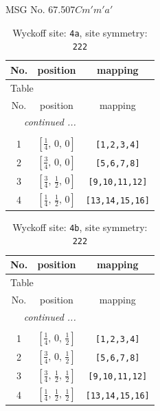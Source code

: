 \documentclass[fleqn,8pt]{jsarticle}
\begin{document}
\setcounter{MaxMatrixCols}{32}

\renewcommand{\tablename}{Table~}
\renewcommand{\figurename}{Figure~}
\begin{center}
\LARGE
MSG No. 67.507\quad$Cm'm'a'$
\end{center}
\renewcommand{\arraystretch}{1.2}
\begin{longtable}{ccc}
\caption{Wyckoff site: {\tt 4a}, site symmetry: {\tt 222}}
 \\
 \hline \hline
No. & position & mapping \\ \hline \endfirsthead

\multicolumn{2}{l}{\tablename\ \thetable{}} \\
 \hline \hline
No. & position & mapping \\ \hline \endhead

 \hline \hline
\multicolumn{2}{r}{\footnotesize\it continued ...} \\ \endfoot

 \hline \hline
\multicolumn{2}{r}{} \\ \endlastfoot

1 & $\left[ \frac{1}{4},\, 0,\, 0 \right]$ & {\tt [1,2,3,4]} \\ \hline
2 & $\left[ \frac{3}{4},\, 0,\, 0 \right]$ & {\tt [5,6,7,8]} \\ \hline
3 & $\left[ \frac{3}{4},\, \frac{1}{2},\, 0 \right]$ & {\tt [9,10,11,12]} \\ \hline
4 & $\left[ \frac{1}{4},\, \frac{1}{2},\, 0 \right]$ & {\tt [13,14,15,16]} \\
\end{longtable}
\renewcommand{\arraystretch}{1.2}
\begin{longtable}{ccc}
\caption{Wyckoff site: {\tt 4b}, site symmetry: {\tt 222}}
 \\
 \hline \hline
No. & position & mapping \\ \hline \endfirsthead

\multicolumn{2}{l}{\tablename\ \thetable{}} \\
 \hline \hline
No. & position & mapping \\ \hline \endhead

 \hline \hline
\multicolumn{2}{r}{\footnotesize\it continued ...} \\ \endfoot

 \hline \hline
\multicolumn{2}{r}{} \\ \endlastfoot

1 & $\left[ \frac{1}{4},\, 0,\, \frac{1}{2} \right]$ & {\tt [1,2,3,4]} \\ \hline
2 & $\left[ \frac{3}{4},\, 0,\, \frac{1}{2} \right]$ & {\tt [5,6,7,8]} \\ \hline
3 & $\left[ \frac{3}{4},\, \frac{1}{2},\, \frac{1}{2} \right]$ & {\tt [9,10,11,12]} \\ \hline
4 & $\left[ \frac{1}{4},\, \frac{1}{2},\, \frac{1}{2} \right]$ & {\tt [13,14,15,16]} \\
\end{longtable}
\end{document}
